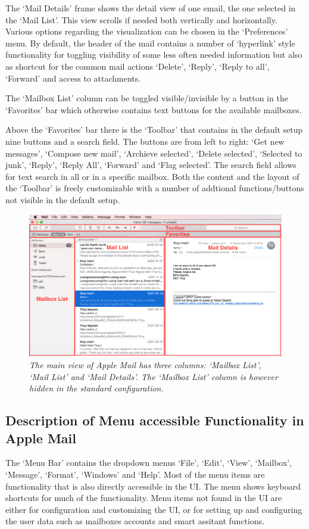 \documentclass[a4paper,11pt,twoside]{article}
\begin{document}
The `Mail Details' frame shows the detail view of one email, the one selected in
the `Mail List'. This view scrolls if needed both vertically and horizontally.
Various options regarding the visualization can be chosen in the `Preferences'
menu. By default, the header of the mail contains a number of `hyperlink' style
functionality for toggling visibility of some less often needed information but
also as shortcut for the common mail actions `Delete', `Reply', `Reply to all',
`Forward' and access to attachments.

The `Mailbox List' column can be toggled visible/invisible
by a button in the `Favorites' bar which otherwise contains text buttons for the
available mailboxes.

Above the `Favorites' bar there is the `Toolbar' that contains in the default
setup nine buttons and a search field. The buttons are from left to right:
`Get new messages', `Compose new mail', `Archieve selected', `Delete selected',
`Selected to junk', `Reply', `Reply All', `Forward' and `Flag selected'. The
search field allows for text search in all or in a specific mailbox. Both
the content and the layout of the `Toolbar' is freely customizable with a number
of addtional functions/buttons not visible in the default setup.


\begin{figure}
  \label{fig:apple_main_screen}
  \centering
    \includegraphics[width=1\textwidth]{main_screen}
    \caption{\textit{The main view of Apple Mail has three columns: `Mailbox List',
    `Mail List' and `Mail Details'. The `Mailbox List' column is however
    hidden in the standard configuration.}}
\end{figure}

\subsection{Description of Menu accessible Functionality in Apple Mail}
The `Menu Bar' contains the dropdown menus `File', `Edit', `View', `Mailbox',
`Message', `Format', `Windows' and `Help'. Most of the menu items are functionality
that is also directly accessible in the UI. The menu shows keyboard shortcuts for
much of the functionality. Menu items not found in the UI are either for
configuration and customizing the UI, or for setting up and configuring the user
data such as mailboxes accounts and smart assitant functions.
\end{document}
